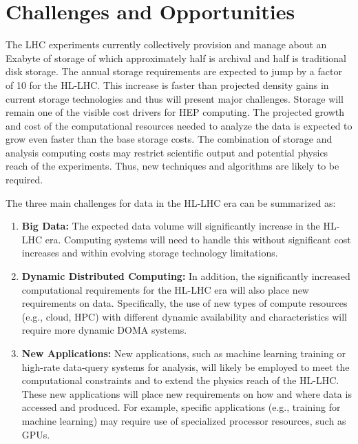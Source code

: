 \documentclass[12pt,a4paper]{article}
\begin{document}
\section{Challenges and
Opportunities}\label{challenges-and-opportunities}

The LHC experiments currently collectively provision and manage about an Exabyte of
storage of which approximately half is archival and half is
traditional disk storage. The annual storage requirements are expected
to jump by a factor of 10 for the HL-LHC. This increase is faster than
projected density gains in current storage technologies and thus will present major challenges. Storage
%
will remain one of the visible cost drivers for HEP computing. The projected growth and cost of the computational resources needed to
analyze the data is expected to grow even faster than the base
storage costs. The combination of storage and analysis computing costs
may restrict scientific output and potential physics reach of the
experiments. Thus, new techniques and algorithms are likely to be
required.

The three main challenges for data in the HL-LHC era can be
summarized as:

\begin{enumerate}
\def\labelenumi{\arabic{enumi}.}
\item \textbf{Big Data:} The expected data volume will significantly increase in the HL-LHC era. Computing systems will need to
  handle this without significant cost increases and within evolving
  storage technology limitations.
\item \textbf{Dynamic Distributed Computing:} In addition, the significantly
  increased computational requirements for the HL-LHC era will also
  place new requirements on data. Specifically, the use of new types of
  compute resources (e.g., cloud, HPC) with different dynamic %
  availability and characteristics will require more dynamic
  DOMA systems.
\item \textbf{New Applications:} New applications, such as machine learning
  training or high-rate data-query systems for analysis, will likely be
  employed to meet the computational constraints and to extend the
  physics reach of the HL-LHC. These new applications will place new
  requirements on how and where data is accessed and produced. For
  example, specific applications (e.g., training for machine learning)
  may require use of specialized processor resources, such as GPUs.
\end{enumerate}
\end{document}
